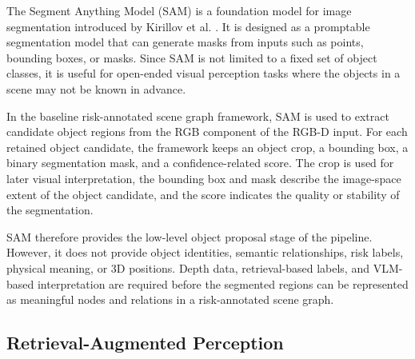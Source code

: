 {\small

The Segment Anything Model (SAM) is a foundation model for image segmentation introduced by Kirillov et al. \cite{kirillov2023segmentanything}. It is designed as a promptable segmentation model that can generate masks from inputs such as points, bounding boxes, or masks. Since SAM is not limited to a fixed set of object classes, it is useful for open-ended visual perception tasks where the objects in a scene may not be known in advance.

In the baseline risk-annotated scene graph framework, SAM is used to extract candidate object regions from the RGB component of the RGB-D input. For each retained object candidate, the framework keeps an object crop, a bounding box, a binary segmentation mask, and a confidence-related score. The crop is used for later visual interpretation, the bounding box and mask describe the image-space extent of the object candidate, and the score indicates the quality or stability of the segmentation.

SAM therefore provides the low-level object proposal stage of the pipeline. However, it does not provide object identities, semantic relationships, risk labels, physical meaning, or 3D positions. Depth data, retrieval-based labels, and VLM-based interpretation are required before the segmented regions can be represented as meaningful nodes and relations in a risk-annotated scene graph.

}

\subsection{Retrieval-Augmented Perception}

